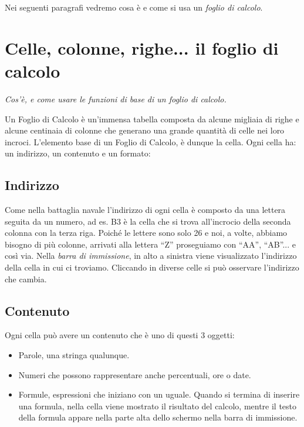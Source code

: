 Nei seguenti paragrafi vedremo cosa è e come si usa un \emph{foglio di calcolo}.

\section{Celle, colonne, righe... il foglio di calcolo}
\label{05_01_f_di_calc:celle-colonne-righe-il-foglio-di-calcolo}

\emph{Cos'è, e come usare le funzioni di base di un foglio di calcolo.}

Un Foglio di Calcolo è un'immensa tabella composta da alcune migliaia di
righe e alcune centinaia di colonne che generano una grande quantità di
celle nei loro incroci.
L'elemento base di un Foglio di Calcolo, è dunque la cella.
Ogni cella ha: un indirizzo, un contenuto e un  formato:

\subsection{Indirizzo}
\label{05_01_f_di_calc:indirizzo}

Come nella battaglia navale l'indirizzo di ogni cella è composto da una
lettera seguita da un numero, ad es. B3 è la cella che si trova all'incrocio
della seconda colonna con la terza riga. Poiché le lettere sono solo 26 e
noi, a volte, abbiamo bisogno di più colonne, arrivati alla lettera ``Z''
proseguiamo con ``AA'', ``AB''... e così via.
Nella \emph{barra di immissione}, in alto a sinistra viene visualizzato
l'indirizzo della cella in cui ci troviamo.
Cliccando in diverse celle si può osservare l'indirizzo che cambia.

\subsection{Contenuto}
\label{05_01_f_di_calc:contenuto}

Ogni cella può avere un contenuto che è uno di questi 3 oggetti:

\begin{itemize}
\item {} 
Parole, una stringa qualunque.
\item {} 
Numeri che possono rappresentare anche percentuali, ore o date.
\item {}
Formule, espressioni che iniziano con un uguale. Quando si termina di
inserire una formula, nella cella viene mostrato il risultato del calcolo,
mentre il testo della formula appare nella parte alta dello schermo nella
barra di immissione.
\end{itemize}

